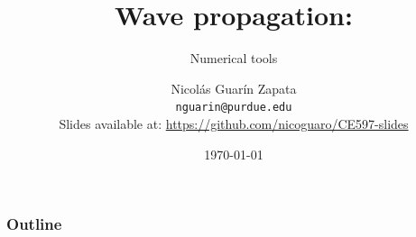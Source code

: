 \documentclass{beamer}
\begin{document}
\title[Wave propagation in solids] %
{Wave propagation:}
\subtitle{Numerical tools}
\author[Guarin-Zapata, Nicolas] %
{Nicol\'as Guar\'in Zapata\\ \texttt{\small nguarin@purdue.edu}\\
{\tiny Slides available at: \url{https://github.com/nicoguaro/CE597-slides}}}
\date{\today}
\subject{Wave propagation}

\frame{\titlepage}

\begin{frame}
	\frametitle{Outline}
	\tableofcontents
\end{frame}
%

\end{document}
